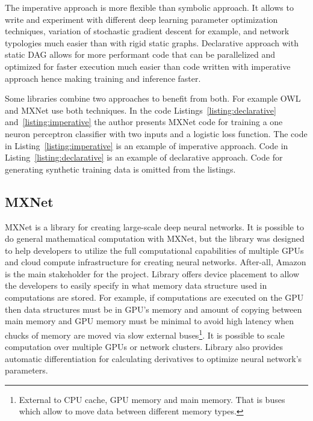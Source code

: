 \documentclass[english, 12pt, a4paper, elec, utf8, online]{aaltothesis}
\begin{document}
The imperative approach is more flexible than symbolic approach. It allows to write and experiment with different deep learning parameter optimization techniques, variation of stochastic gradient descent for example, and network typologies much easier than with rigid static graphs. Declarative approach with static DAG allows for more performant code that can be parallelized and optimized for faster execution much easier than code written with imperative approach hence making training and inference faster. 

Some libraries combine two approaches to benefit from both. For example OWL and MXNet use both techniques. In the code Listings~\ref{listing:declarative} and~\ref{listing:imperative}  the author presents MXNet code for training a one neuron perceptron classifier with two inputs and a logistic loss function. The code  in Listing~\ref{listing:imperative} is an example of imperative approach. Code in Listing~\ref{listing:declarative} is an example of declarative approach. Code for generating synthetic training data is omitted from the listings.





\subsection{MXNet}
MXNet is a library for creating large-scale deep neural networks. It is possible to do general mathematical computation with MXNet, but the library was designed to help developers to utilize the full computational capabilities of multiple GPUs and cloud compute infrastructure for creating neural networks. After-all, Amazon is the main stakeholder for the project. Library offers device placement to allow the developers to easily specify in what memory data structure used in computations are stored. For example, if computations are executed on the GPU then data structures must be in GPU’s memory and amount of copying between main memory and GPU memory must be minimal to avoid high latency when chucks of memory are moved via slow external buses\footnote{External to CPU cache, GPU memory and main memory. That is buses which allow to move data between different memory types.}.  It is possible to scale computation over multiple GPUs or network clusters. Library also provides automatic differentiation for calculating derivatives to optimize neural network's parameters.
\end{document}
